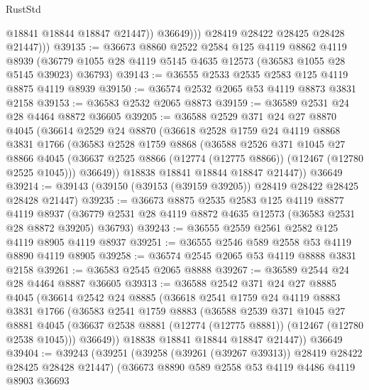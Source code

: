 \begin{lexlean}{RustStd}
\begin{coremodule}
                    @18841
                    @18844
                    @18847
                    @21447))
                @36649)))
          @28419
          @28422
          @28425
          @28428
          @21447)))
@39135 := @36673
    @8860
    @2522
    @2584
    @125
    @4119
    @8862
    @4119
    @8939
    (@36779 @1055 @28 @4119 @5145 @4635 @12573 (@36583 @1055 @28 @5145 @39023) @36793)
@39143 := @36555 @2533 @2535 @2583 @125 @4119 @8875 @4119 @8939
@39150 := @36574 @2532 @2065 @53 @4119 @8873 @3831 @2158
@39153 := @36583 @2532 @2065 @8873
@39159 := @36589 @2531 @24 @28 @4464 @8872 @36605
@39205 := @36588
    @2529
    @371
    @24
    @27
    @8870
    @4045
    (@36614
      @2529
      @24
      @8870
      (@36618
        @2528
        @1759
        @24
        @4119
        @8868
        @3831
        @1766
        (@36583
          @2528
          @1759
          @8868
          (@36588
            @2526
            @371
            @1045
            @27
            @8866
            @4045
            (@36637 @2525 @8866 (@12774 (@12775 @8866)) (@12467 (@12780 @2525 @1045)))
            @36649))
        @18838
        @18841
        @18844
        @18847
        @21447))
    @36649
@39214 := @39143 (@39150 (@39153 (@39159 @39205)) @28419 @28422 @28425 @28428 @21447)
@39235 := @36673
    @8875
    @2535
    @2583
    @125
    @4119
    @8877
    @4119
    @8937
    (@36779 @2531 @28 @4119 @8872 @4635 @12573 (@36583 @2531 @28 @8872 @39205) @36793)
@39243 := @36555 @2559 @2561 @2582 @125 @4119 @8905 @4119 @8937
@39251 := @36555 @2546 @589 @2558 @53 @4119 @8890 @4119 @8905
@39258 := @36574 @2545 @2065 @53 @4119 @8888 @3831 @2158
@39261 := @36583 @2545 @2065 @8888
@39267 := @36589 @2544 @24 @28 @4464 @8887 @36605
@39313 := @36588
    @2542
    @371
    @24
    @27
    @8885
    @4045
    (@36614
      @2542
      @24
      @8885
      (@36618
        @2541
        @1759
        @24
        @4119
        @8883
        @3831
        @1766
        (@36583
          @2541
          @1759
          @8883
          (@36588
            @2539
            @371
            @1045
            @27
            @8881
            @4045
            (@36637 @2538 @8881 (@12774 (@12775 @8881)) (@12467 (@12780 @2538 @1045)))
            @36649))
        @18838
        @18841
        @18844
        @18847
        @21447))
    @36649
@39404 := @39243
    (@39251
      (@39258 (@39261 (@39267 @39313)) @28419 @28422 @28425 @28428 @21447)
      (@36673
        @8890
        @589
        @2558
        @53
        @4119
        @4486
        @4119
        @8903
        @36693

\end{coremodule}
\end{lexlean}
